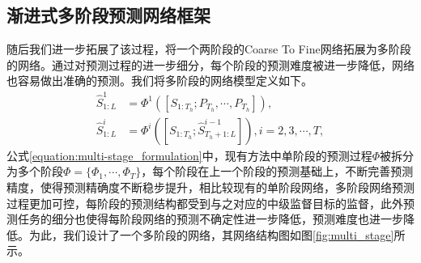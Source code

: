 \subsection{渐进式多阶段预测网络框架}
随后我们进一步拓展了该过程，将一个两阶段的Coarse To Fine网络拓展为多阶段的网络。通过对预测过程的进一步细分，每个阶段的预测难度被进一步降低，网络也容易做出准确的预测。我们将多阶段的网络模型定义如下。
\begin{equation}
    \begin{aligned}
         \hat{S}_{1:L}^{1} &= \Phi^1([{S}_{1:T_h};P_{T_h},\cdots,P_{T_h}]), \\
        \hat{S}_{1:L}^{i} &= \Phi^i([S_{1:T_h};\hat{S}_{T_h+1:L}^{i-1}]), i = {2,3,\cdots,T},
    \end{aligned}
    \label{equation:multi-stage_formulation}
\end{equation}
公式\ref{equation:multi-stage_formulation}中，现有方法中单阶段的预测过程$\Phi$被拆分为多个阶段$\Phi = \{ \Phi_1, \cdots, \Phi_T\}$，每个阶段在上一个阶段的预测基础上，不断完善预测精度，使得预测精确度不断稳步提升，相比较现有的单阶段网络，多阶段网络预测过程更加可控，每阶段的预测结构都受到与之对应的中级监督目标的监督，此外预测任务的细分也使得每阶段网络的预测不确定性进一步降低，预测难度也进一步降低。为此，我们设计了一个多阶段的网络，其网络结构图如图\ref{fig:multi_stage}所示。

